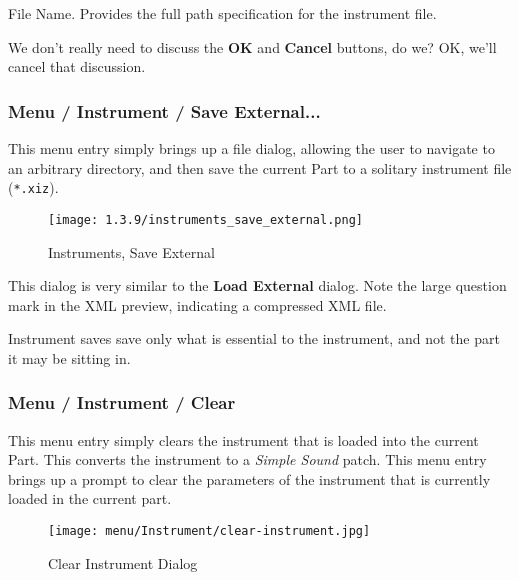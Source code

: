    File Name.
   Provides the full path specification for the instrument file.

   We don't really need to discuss the \textbf{OK} and \textbf{Cancel}
   buttons, do we?  OK, we'll cancel that discussion.

\subsubsection{Menu / Instrument / Save External...}
\label{subsubsec:menu_instrument_save}

   This menu entry simply brings up a file dialog, allowing the user to
   navigate to an arbitrary directory, and then save the current Part
   to a solitary instrument file (\texttt{*.xiz}).

\begin{figure}[H]
   \centering 
   \texttt{[image: 1.3.9/instruments\_save\_external.png]}
   \caption{Instruments, Save External}
   \label{fig:instruments_save_external}
\end{figure}

   This dialog is very similar to the \textbf{Load External} dialog.
   Note the large question mark in the XML preview, indicating a compressed XML
   file.

   Instrument saves save only what is essential to the instrument, and not the
   part it may be sitting in.

\subsubsection{Menu / Instrument / Clear}
\label{subsubsec:menu_instrument_clear}

   This menu entry simply clears the instrument that is loaded into the current
   Part.  This converts the instrument to a 
   \textsl{Simple Sound} patch.
   This menu entry brings up a prompt to clear the parameters of the
   instrument that is currently loaded in the current part.

\begin{figure}[H]
   \centering 
   \texttt{[image: menu/Instrument/clear-instrument.jpg]}
   \caption{Clear Instrument Dialog}
   \label{fig:clear_instrument_dialog}
\end{figure}

